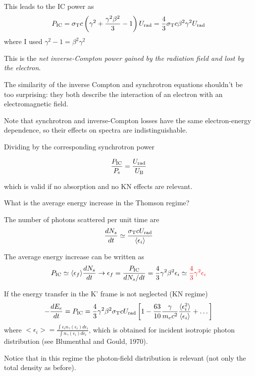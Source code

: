 This leads to the IC power as
%
\begin{equation*}
P_{\rm IC} = \sigma_{\rm T} c \left(\gamma^2 +\frac{\gamma^2 \beta^2}{3} -1 \right) U_{\rm rad} = \frac{4}{3}
\sigma_{\rm T} c \beta^2 \gamma^2 U_{\rm rad}
\end{equation*}
%
where I used $\gamma^2 - 1 = \beta^2 \gamma^2$

This is the \emph{net inverse-Compton power gained by the radiation field and lost by the electron}. 

The similarity of the inverse Compton and synchrotron equations shouldn’t be too surprising: they both describe the interaction of an electron with an electromagnetic field.

Note that synchrotron and inverse-Compton losses have the same electron-energy dependence, so their effects on  spectra are indistinguishable.

Dividing by the corresponding synchrotron power 
%
\begin{remark}
\[
\frac{P_{\rm IC}}{P_{\rm s}} = \frac{U_{\rm rad}}{U_{\rm B}}    
\]
\end{remark}
%
which is valid if no absorption and no KN effects are relevant.

What is the average energy increase in the Thomson regime? 

 The number of photons scattered per unit time are
%
\begin{equation*}
\frac{dN_s}{dt} \simeq \frac{\sigma_{\rm T} c U_{\rm rad}}{\langle \epsilon_i \rangle}
\end{equation*}

The average energy increase can be written as
%
\begin{equation*}
P_{\rm IC} \simeq \langle \epsilon_f \rangle \frac{dN_s}{dt} \rightarrow \epsilon_f = \frac{P_{\rm IC}}{dN_s/dt} = \frac{4}{3} \gamma^2 \beta^2 \epsilon_i \simeq {\color{red}\frac{4}{3} \gamma^2 \epsilon_i}
\end{equation*}

If the energy transfer in the K' frame is not neglected (KN regime)
%
\begin{equation*}
- \frac{dE_e}{dt} = P_{\rm IC} = \frac{4}{3} \gamma^2 \beta^2 \sigma_{\rm T} c U_{\rm rad} \left[1 - \frac{63}{10} \frac{\gamma}{m_e c^2} \frac{\langle \epsilon_i^2 \rangle}{\langle \epsilon_i \rangle} + \dots \right]
\end{equation*}
%
where $<\epsilon_i> = \frac{\int \epsilon_i n_\gamma(\epsilon_i) d\epsilon_i}{\int n_\gamma(\epsilon_i) d\epsilon_i}$, which is obtained for incident isotropic photon distribution (see Blumenthal and Gould, 1970).

 Notice that in this regime the photon-field  distribution is relevant (not only the total density as before).